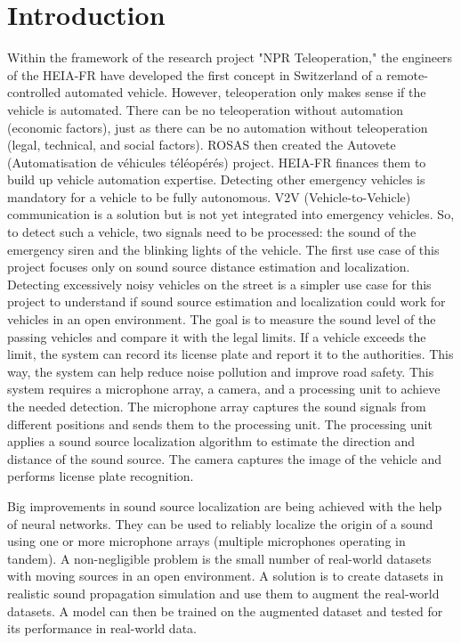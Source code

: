 \chapter{Introduction}
\label{ch:introduction}
Within the framework of the research project "NPR Teleoperation," the engineers of the HEIA-FR have developed the first concept in Switzerland of a remote-controlled automated vehicle. However, teleoperation only makes sense if the vehicle is automated. There can be no teleoperation without automation (economic factors), just as there can be no automation without teleoperation (legal, technical, and social factors). ROSAS then created the Autovete (Automatisation de véhicules téléopérés) project. HEIA-FR finances them to build up vehicle automation expertise. Detecting other emergency vehicles is mandatory for a vehicle to be fully autonomous. V2V (Vehicle-to-Vehicle) communication is a solution but is not yet integrated into emergency vehicles.
So, to detect such a vehicle, two signals need to be processed: the sound of the emergency siren and the blinking lights of the vehicle. The first use case of this project focuses only on sound source distance estimation and localization. Detecting excessively noisy vehicles on the street is a simpler use case for this project to understand if sound source estimation and localization could work for vehicles in an open environment. The goal is to measure the sound level of the passing vehicles and compare it with the legal limits. If a vehicle exceeds the limit, the system can record its license plate and report it to the authorities. This way, the system can help reduce noise pollution and improve road safety. This system requires a microphone array, a camera, and a processing unit to achieve the needed detection. The microphone array captures the sound signals from different positions and sends them to the processing unit. The processing unit applies a sound source localization algorithm to estimate the direction and distance of the sound source. The camera captures the image of the vehicle and performs license plate recognition. 

Big improvements in sound source localization are being achieved with the help of neural networks\cite{Grumiaux_2022}. They can be used to reliably localize the origin of a sound using one or more microphone arrays (multiple microphones operating in tandem). A non-negligible problem is the small number of real-world datasets with moving sources in an open environment. A solution is to create datasets in realistic sound propagation simulation and use them to augment the real-world datasets. A model can then be trained on the augmented dataset and tested for its performance in real-world data. 

